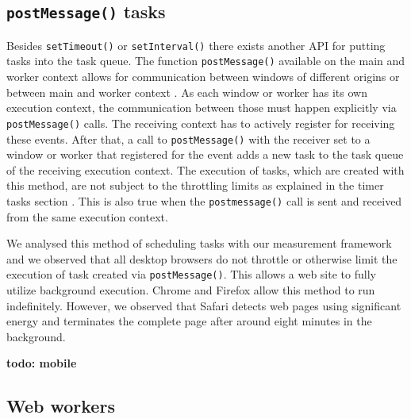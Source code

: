 \documentclass[
	ruledheaders=section,%
	class=report,%
	thesis={type=bachelor},%
	accentcolor=9c,%
	custommargins=true,%
	marginpar=false,%
	parskip=half-,%
	fontsize=11pt,%
]{tudapub}
\begin{document}
  \subsection{\texttt{postMessage()} tasks}

  Besides \texttt{setTimeout()} or \texttt{setInterval()} there exists another API for putting tasks into the task queue. The function \texttt{postMessage()} available on the main and worker context allows for communication between windows of different origins or between main and worker context \cite{mdn-postmessage}. As each window or worker has its own execution context, the communication between those must happen explicitly via \texttt{postMessage()} calls. The receiving context has to actively register for receiving these events. After that, a call to \texttt{postMessage()} with the receiver set to a window or worker that registered for the event adds a new task to the task queue of the receiving execution context. The execution of tasks, which are created with this method, are not subject to the throttling limits as explained in the timer tasks section \cite{zero-delay-timeouts}. This is also true when the \texttt{postmessage()} call is sent and received from the same execution context.

  We analysed this method of scheduling tasks with our measurement framework and we observed that all desktop browsers do not throttle or otherwise limit the execution of task created via \texttt{postMessage()}. This allows a web site to fully utilize background execution. Chrome and Firefox allow this method to run indefinitely. However, we observed that Safari detects web pages using significant energy and terminates the complete page after around eight minutes in the background.

  \textbf{todo: mobile}


  
  \subsection{Web workers}
\end{document}

